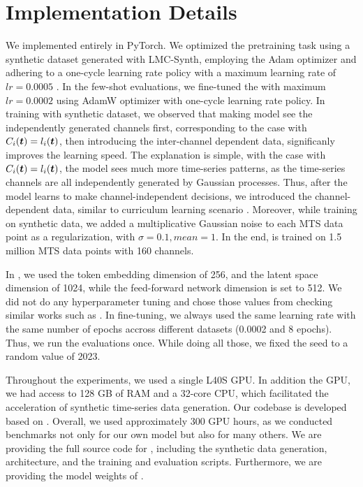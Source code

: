 \section{Implementation Details}
We implemented \name entirely in PyTorch. We optimized the pretraining task using a synthetic dataset generated with LMC-Synth, employing the Adam optimizer \cite{KingBa15} and adhering to a one-cycle learning rate policy with a maximum learning rate of $lr=0.0005$ \cite{onecycleLR}. In the few-shot evaluations, we fine-tuned the \name with maximum $lr=0.0002$ using AdamW optimizer \cite{loshchilov2019decoupledweightdecayregularization} with one-cycle learning rate policy. In training \name with synthetic dataset, we observed that making model see the independently generated channels first, corresponding to the case with $C_i(\bm{t}) =  l_i(\bm{t})$, then introducing the inter-channel dependent data, significanly improves the learning speed. The explanation is simple, with the case with $C_i(\bm{t}) =  l_i(\bm{t})$, the model sees much more time-series patterns, as the time-series channels are all independently generated by Gaussian processes. Thus, after the model learns to make channel-independent decisions, we introduced the channel-dependent data, similar to curriculum learning scenario \cite{curriculum_learning}. Moreover, while training on synthetic data, we added a multiplicative Gaussian noise to each MTS data point as a regularization, with $\sigma = 0.1, mean = 1$.  In the end, \name is trained on 1.5 million MTS data points with 160 channels. 

In \name, we used the token embedding dimension of 256, and the latent space dimension of 1024, while the feed-forward network dimension is set to 512. We did not do any hyperparameter tuning and chose those values from checking similar works such as \cite{Yuqietal-2023-PatchTST, liu2023itransformer}. In fine-tuning, we always used the same learning rate with the same number of epochs accross different datasets (0.0002 and 8 epochs). Thus, we run the evaluations once. While doing all those, we fixed the seed to a random value of 2023.  

Throughout the experiments, we used a single L40S GPU. In addition the GPU, we had access to 128 GB of RAM and a 32-core CPU, which facilitated the acceleration of synthetic time-series data generation. Our codebase is developed based on \cite{liu2023itransformer}. Overall, we used approximately 300 GPU hours, as we conducted benchmarks not only for our own model but also for many others. We are providing the full source code for \name, including the synthetic data generation, architecture, and the training and evaluation scripts. Furthermore, we are providing the model weights of \name.